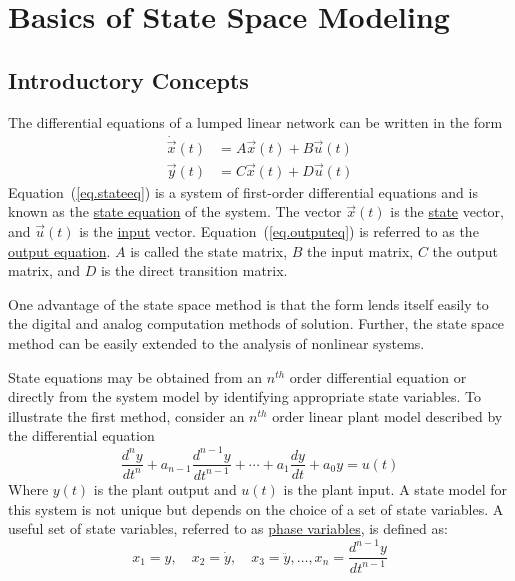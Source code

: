 \chapter{Basics of State Space Modeling} \label{app.statespace}
\section{Introductory Concepts}

The differential equations of a lumped linear network can be written in the form
\begin{subequations}
\begin{flalign}
    \dot{\vec{x}}(t)    & = A\vec{x}(t) + B\vec{u}(t) \label{eq.stateeq}\\
    \vec{y}(t)    & = C\vec{x}(t) + D\vec{u}(t) \label{eq.outputeq}
\end{flalign}
\end{subequations}
Equation~(\ref{eq.stateeq}) is a system of first-order differential equations and is known as the \uline{state equation} of the system.  The vector $\vec{x}(t)$ is the \uline{state} vector, and $\vec{u}(t)$ is the \uline{input} vector.  Equation~(\ref{eq.outputeq}) is referred to as the \uline{output equation}.  $A$ is called the state matrix, $B$ the input matrix, $C$ the output matrix, and $D$ is the direct transition matrix.
\par
One advantage of the state space method is that the form lends itself easily to the digital and analog computation methods of solution.  Further, the state space method can be easily extended to the analysis of nonlinear systems.
\par
State equations may be obtained from an $n^{th}$ order differential equation or directly from the system model by identifying appropriate state variables.  To illustrate the first method, consider an $n^{th}$ order linear plant model described by the differential equation
\begin{equation}
    \frac{d^ny}{dt^n} + a_{n-1} \frac{d^{n-1}y}{dt^{n-1}} +
        \cdots + a_1 \frac{dy}{dt} + a_0 y = u(t)
        \label{eq.nthorder}
\end{equation}
Where $y(t)$ is the plant output and $u(t)$ is the plant input.  A state model for this system is not unique but depends on the choice of a set of state variables.  A useful set of state variables, referred to as \uline{phase variables}, is defined as:
\begin{equation}
    x_1 = y, \quad x_2 = \dot{y}, \quad x_3 = \ddot{y}, \ldots,
        x_n = \frac{d^{n-1}y}{dt^{n-1}}
        \label{eq.differentiatestate}
\end{equation}
